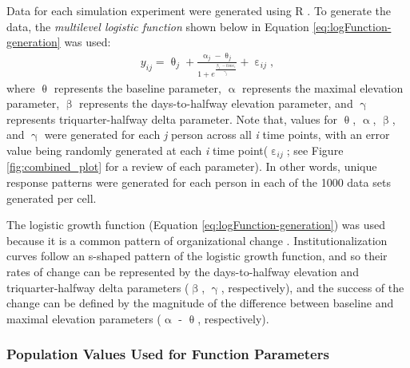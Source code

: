 \documentclass[
12pt, %
twoside,
english]{guelphthesis}
\begin{document}
Data for each simulation experiment were generated using R \autocite{rstudio}.
To generate the data, the \emph{multilevel logistic function} shown below
in Equation \eqref{eq:logFunction-generation} was used:
\begin{align}
  y_{ij} = \uptheta_j + \frac{\upalpha_j - \uptheta_j}{{1 + e^\frac{\upbeta_j - time_i}{\upgamma_j}}} + \upepsilon_{ij}, 
\label{eq:logFunction-generation}
\end{align}
\noindent where \(\uptheta\) represents the baseline parameter, \(\upalpha\)
represents the maximal elevation parameter, \(\upbeta\) represents the
days-to-halfway elevation parameter, and \(\upgamma\) represents
triquarter-halfway delta parameter. Note that, values for \(\uptheta\),
\(\upalpha\), \(\upbeta\), and \(\upgamma\) were generated for each \emph{j} person
across all \emph{i} time points, with an error value being randomly generated
at each \emph{i} time point(\(\upepsilon_{ij}\); see Figure \ref{fig:combined_plot} for a review of each parameter). In other words, unique response patterns were generated for each person in each of the 1000
data sets generated per cell.

The logistic growth function (Equation \ref{eq:logFunction-generation})
was used because it is a common pattern of organizational change \autocite[or
institutionalization;][]{lawrence2001}. Institutionalization curves follow
an s-shaped pattern of the logistic growth function, and so their rates
of change can be represented by the days-to-halfway elevation and
triquarter-halfway delta parameters (\(\upbeta\), \(\upgamma\),
respectively), and the success of the change can be defined by the
magnitude of the difference between baseline and maximal elevation
parameters (\(\upalpha\) - \(\uptheta\), respectively).

\hypertarget{population-values-used-for-function-parameters}{%
\subsubsection{Population Values Used for Function Parameters}\label{population-values-used-for-function-parameters}}
\end{document}
